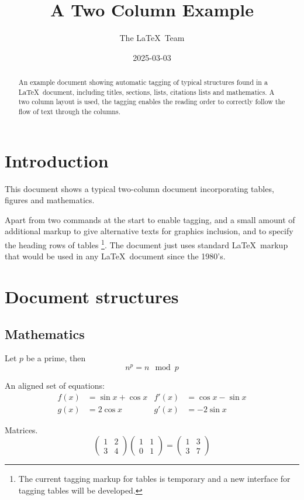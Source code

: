 \documentclass[a4paper,twocolumn]{article}
\begin{document}
\title{A Two Column Example}
\date{2025-03-03}
\author{The \LaTeX\ Team}

\pagestyle{headings}

\maketitle

\begin{abstract}
  An example document showing automatic tagging of typical structures
  found in a \LaTeX\ document, including titles, sections, lists,
  citations lists and mathematics. A two column layout is used, the
  tagging enables the reading order to correctly follow the flow of
  text through the columns.
\end{abstract}

\tableofcontents

\section{Introduction}

This document shows a typical two-column document incorporating tables, figures and mathematics.

Apart from two commands at the start to enable tagging, and a small
amount of additional markup to give alternative texts for graphics
inclusion, and to specify the heading rows of tables%
\footnote{The current tagging markup for tables is temporary and a new interface
for tagging tables will be developed.}. The document
just uses standard \LaTeX\ markup that would be used in any \LaTeX\
document since the 1980's.

\section{Document structures}

\subsection{Mathematics}

Let $p$ be a prime, then
\[n^p=n \mod p\]

An aligned set of equations:
\begin{align}
  f(x)&=\sin x + \cos x  & f'(x) &=\cos x - \sin x \\
  g(x)&=2\cos x          & g'(x) &= -2\sin x 
\end{align}

Matrices.
\[
\begin{pmatrix}1&2\\3&4\end{pmatrix}
\begin{pmatrix}1&1\\0&1\end{pmatrix}
=
\begin{pmatrix}1&3\\3&7\end{pmatrix}
\]
\end{document}

